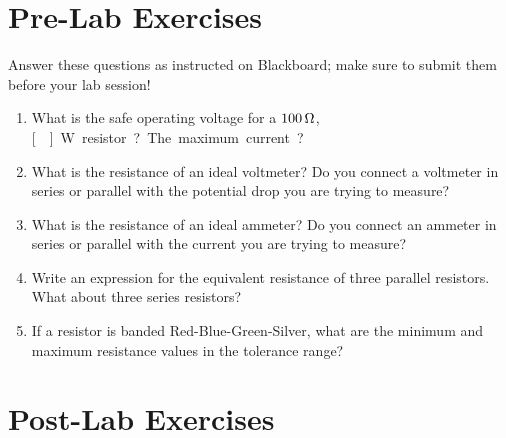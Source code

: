 \documentclass[12pt]{article}
\begin{document}
\newpage

\section*{Pre-Lab Exercises}

Answer these questions as instructed on Blackboard; make sure to
submit them before your lab session!

\begin{enumerate}
\item What is the safe operating voltage for a $\unit[100]{\Omega}$,
  \unit[]{W} resistor?  The maximum current?
\item What is the resistance of an ideal voltmeter?  Do you connect a
  voltmeter in series or parallel with the potential drop you are
  trying to measure?
\item What is the resistance of an ideal ammeter?  Do you connect an
  ammeter in series or parallel with the current you are trying to
  measure? 
\item Write an expression for the equivalent resistance of three
  parallel resistors.  What about three series resistors?
\item If a resistor is banded Red-Blue-Green-Silver, what are the
  minimum and maximum resistance values in the tolerance range?
\end{enumerate}

\newpage

\section*{Post-Lab Exercises}
\end{document}
